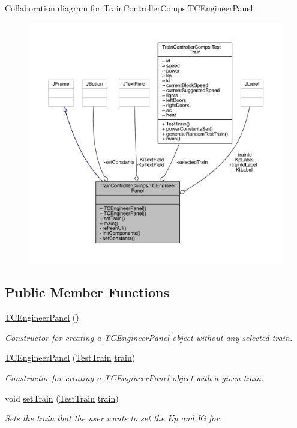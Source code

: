 Collaboration diagram for Train\+Controller\+Comps.\+T\+C\+Engineer\+Panel\+:
\nopagebreak
\begin{figure}[H]
\begin{center}
\leavevmode
\includegraphics[width=350pt]{classTrainControllerComps_1_1TCEngineerPanel__coll__graph}
\end{center}
\end{figure}
\subsection*{Public Member Functions}
\begin{DoxyCompactItemize}
\item 
\hyperlink{classTrainControllerComps_1_1TCEngineerPanel_a5d8fd85270c170367dee1716ef758b21}{T\+C\+Engineer\+Panel} ()
\begin{DoxyCompactList}\small\item\em Constructor for creating a \hyperlink{classTrainControllerComps_1_1TCEngineerPanel}{T\+C\+Engineer\+Panel} object without any selected train. \end{DoxyCompactList}\item 
\hyperlink{classTrainControllerComps_1_1TCEngineerPanel_ad082ea6d180a9c420a1b474bc36d1127}{T\+C\+Engineer\+Panel} (\hyperlink{classTrainControllerComps_1_1TestTrain}{Test\+Train} \hyperlink{classtrain}{train})
\begin{DoxyCompactList}\small\item\em Constructor for creating a \hyperlink{classTrainControllerComps_1_1TCEngineerPanel}{T\+C\+Engineer\+Panel} object with a given train. \end{DoxyCompactList}\item 
void \hyperlink{classTrainControllerComps_1_1TCEngineerPanel_acf2325516cf881be1f635cc7bdbc4237}{set\+Train} (\hyperlink{classTrainControllerComps_1_1TestTrain}{Test\+Train} \hyperlink{classtrain}{train})
\begin{DoxyCompactList}\small\item\em Sets the train that the user wants to set the Kp and Ki for. \end{DoxyCompactList}\end{DoxyCompactItemize}
